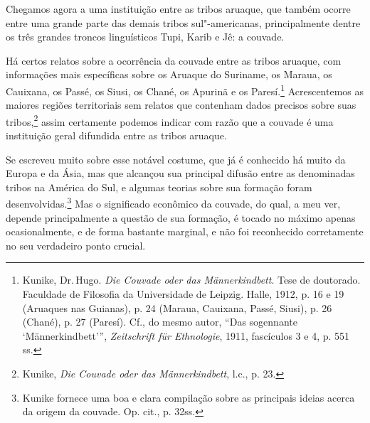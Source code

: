 Chegamos agora a uma instituição entre as tribos aruaque, que também
ocorre entre uma grande parte das demais tribos sul"-americanas,
principalmente dentre os três grandes troncos linguísticos Tupi, Karib
e Jê: a couvade.

Há certos relatos sobre a ocorrência da couvade entre as tribos aruaque,
com informações mais específicas sobre os Aruaque do Suriname, os
Maraua, os Cauixana, os Passé, os Siusi, os Chané, os Apurinã e os
Paresí.\footnote{Kunike, Dr.\,Hugo. \emph{Die Couvade oder das
  Männerkindbett}. Tese de doutorado. Faculdade de Filosofia da
  Universidade de Leipzig. Halle, 1912, p. 16 e 19 (Aruaques nas
  Guianas), p. 24 (Maraua, Cauixana, Passé, Siusi), p. 26 (Chané), p. 27
  (Paresí). Cf., do mesmo autor, ``Das sogennante `Männerkindbett''',
  \emph{Zeitschrift für Ethnologie}, 1911, fascículos 3 e 4, p. 551 ss.}
Acrescentemos as maiores regiões territoriais sem relatos que contenham
dados precisos sobre suas tribos,\footnote{Kunike, \emph{Die Couvade oder
  das Männerkindbett}, l.c., p. 23.} assim certamente podemos indicar
com razão que a couvade é uma instituição geral difundida entre as
tribos aruaque.

Se escreveu muito sobre esse notável costume, que já é conhecido há
muito da Europa e da Ásia, mas que alcançou sua principal difusão entre
as denominadas tribos na América do Sul, e algumas teorias sobre sua
formação foram desenvolvidas.\footnote{Kunike fornece uma boa e clara
  compilação sobre as principais ideias acerca da origem da couvade. Op.
  cit., p. 32ss.} Mas o significado econômico da couvade, do qual, a
meu ver, depende principalmente a questão de sua formação, é tocado no
máximo apenas ocasionalmente, e de forma bastante marginal, e não foi
reconhecido corretamente no seu verdadeiro ponto crucial.


